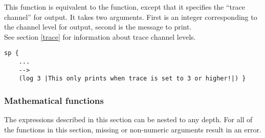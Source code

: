 \begin{description}

\item [\soarb{log} --- ] This function is equivalent to the  function,
except that it specifies the ``trace channel'' for output. It takes two arguments. First is an integer
corresponding to the channel level for output, second is the message to print. \\
See section \ref{trace} for information about trace channel levels.

\begin{verbatim}
sp {
	...
	-->
	(log 3 |This only prints when trace is set to 3 or higher!|) }
\end{verbatim}


\end{description}

\subsubsection{Mathematical functions}

The expressions described in this section can be nested to any depth. For all
of the functions in this section, missing or non-numeric arguments result 
in an error.


